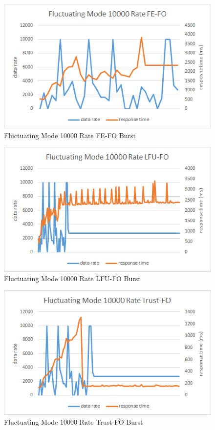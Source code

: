 \begin{figure}[!htbp]
	\centering
	\includegraphics[width=\textwidth]{img/app3-f-10000-fefo.png}
	\caption{Fluctuating Mode 10000 Rate FE-FO Burst}
\end{figure}
\begin{figure}[!htbp]
	\centering
	\includegraphics[width=\textwidth]{img/app3-f-10000-lfufo.png}
	\caption{Fluctuating Mode 10000 Rate LFU-FO Burst}
\end{figure}
\begin{figure}[!htbp]
	\centering
	\includegraphics[width=\textwidth]{img/app3-f-10000-trustfo.png}
	\caption{Fluctuating Mode 10000 Rate Trust-FO Burst}
\end{figure}
